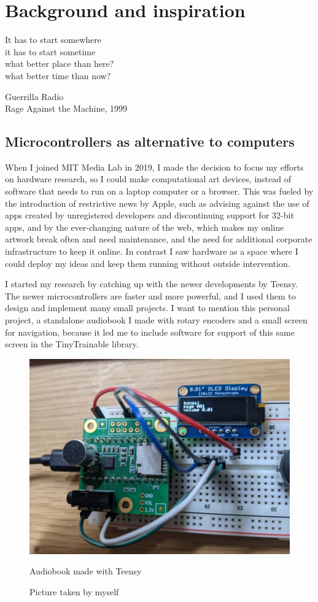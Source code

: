 \chapter{Background and inspiration}

\epigraph{It has to start somewhere \\ it has to start sometime \\ what better place than here? \\ what better time than now?}{Guerrilla Radio \\ Rage Against the Machine, 1999}

\section{Microcontrollers as alternative to computers}

When I joined MIT Media Lab in 2019, I made the decision to focus my efforts on hardware research, so I could make computational art devices, instead of software that needs to run on a laptop computer or a browser. This was fueled by the introduction of restrictive news by Apple, such as advising against the use of apps created by unregistered developers and discontinuing support for 32-bit apps, and by the ever-changing nature of the web, which makes my online artwork break often and need maintenance, and the need for additional corporate infrastructure to keep it online. In contrast I saw hardware as a space where I could deploy my ideas and keep them running without outside intervention.

I started my research by catching up with the newer developments by Teensy. The newer microcontrollers are faster and more powerful, and I used them to design and implement many small projects. I want to mention this personal project, a standalone audiobook I made with rotary encoders and a small screen for navigation, because it led me to include software for support of this same screen in the TinyTrainable library.

\begin{figure}[ht]
  \centering
  \includegraphics[width=0.75\linewidth,height=0.40\textheight,keepaspectratio]{images/bonsai.jpg}
  \caption{Audiobook made with Teensy}
  \caption*{Picture taken by myself}
  \label{fig:bonsai-audiobook}
\end{figure}

